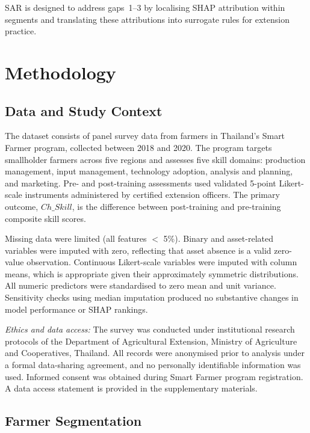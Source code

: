 \documentclass[3p,twocolumn,authoryear]{elsarticle}
\begin{document}
SAR is designed to address gaps~1--3 by localising SHAP attribution within
segments and translating these attributions into surrogate rules for
extension practice.

\section{Methodology}

\subsection{Data and Study Context}

The dataset consists of panel survey data from farmers in Thailand's Smart
Farmer program, collected between 2018 and 2020.
The program targets smallholder farmers across five regions and assesses
five skill domains: production management, input management, technology
adoption, analysis and planning, and marketing.
Pre- and post-training assessments used validated 5-point Likert-scale
instruments administered by certified extension officers.
The primary outcome, $Ch\_Skill$, is the difference between post-training
and pre-training composite skill scores.

Missing data were limited (all features $<$ 5\%).
Binary and asset-related variables were imputed with zero, reflecting
that asset absence is a valid zero-value observation.
Continuous Likert-scale variables were imputed with column means, which
is appropriate given their approximately symmetric distributions.
All numeric predictors were standardised to zero mean and unit variance.
Sensitivity checks using median imputation produced no substantive
changes in model performance or SHAP rankings.

\textit{Ethics and data access:}
The survey was conducted under institutional research protocols of the
Department of Agricultural Extension, Ministry of Agriculture and
Cooperatives, Thailand.
All records were anonymised prior to analysis under a formal
data-sharing agreement, and no personally identifiable information was
used.
Informed consent was obtained during Smart Farmer program registration.
A data access statement is provided in the supplementary materials.

\subsection{Farmer Segmentation}
\end{document}
